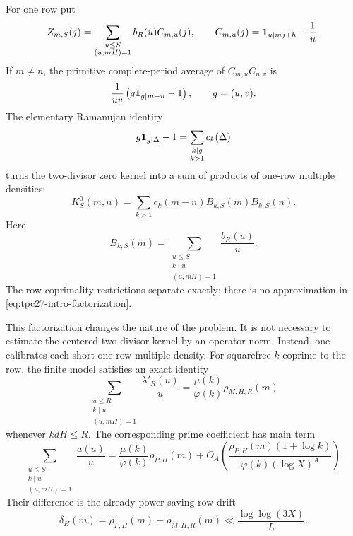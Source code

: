 For one row put
\begin{equation}
 Z_{m,S}(j)=
 \sum_{\substack{u\le S\\(u,mH)=1}}
 b_R(u)C_{m,u}(j),
 \qquad
 C_{m,u}(j)=\mathbf 1_{u\mid mj+h}-\frac1u.
 \label{eq:tpc27-intro-centered-signal}
\end{equation}
If \(m\ne n\), the primitive complete-period average of
\(C_{m,u}C_{n,v}\) is
\begin{equation}
 \frac1{uv}
 \left(g\mathbf 1_{g\mid m-n}-1\right),
 \qquad g=(u,v).
 \label{eq:tpc27-intro-connected-zero}
\end{equation}
The elementary Ramanujan identity
\begin{equation}
 g\mathbf 1_{g\mid\Delta}-1
 =\sum_{\substack{k\mid g\\k>1}}c_k(\Delta)
 \label{eq:tpc27-intro-Ramanujan-identity}
\end{equation}
turns the two-divisor zero kernel into a sum of products of one-row
multiple densities:
\begin{equation}
 \boxed{
 K_S^0(m,n)=
 \sum_{k>1}c_k(m-n)B_{k,S}(m)B_{k,S}(n).}
 \label{eq:tpc27-intro-factorization}
\end{equation}
Here
\begin{equation}
 B_{k,S}(m)=
 \sum_{\substack{u\le S\\k\mid u\\(u,mH)=1}}
 \frac{b_R(u)}u.
 \label{eq:tpc27-intro-Bk}
\end{equation}
The row coprimality restrictions separate exactly; there is no
approximation in \eqref{eq:tpc27-intro-factorization}.

This factorization changes the nature of the problem.  It is not
necessary to estimate the centered two-divisor kernel by an operator
norm.  Instead, one calibrates each short one-row multiple density.
For squarefree \(k\) coprime to the row, the finite model satisfies an
exact identity
\begin{equation}
 \sum_{\substack{u\le R\\k\mid u\\(u,mH)=1}}
 \frac{\lambda'_R(u)}u
 =\frac{\mu(k)}{\varphi(k)}\rho_{M,H,R}(m)
 \label{eq:tpc27-intro-model-multiple}
\end{equation}
whenever \(kdH\le R\).  The corresponding prime coefficient has main
term
\begin{equation}
 \sum_{\substack{u\le S\\k\mid u\\(u,mH)=1}}
 \frac{a(u)}u
 =\frac{\mu(k)}{\varphi(k)}\rho_{P,H}(m)
 +O_A\!\left(
 \frac{\rho_{P,H}(m)(1+\log k)}
 {\varphi(k)(\log X)^A}\right).
 \label{eq:tpc27-intro-prime-multiple}
\end{equation}
Their difference is the already power-saving row drift
\[
 \delta_H(m)=\rho_{P,H}(m)-\rho_{M,H,R}(m)
 \ll \frac{\log\log(3X)}L.
\]

